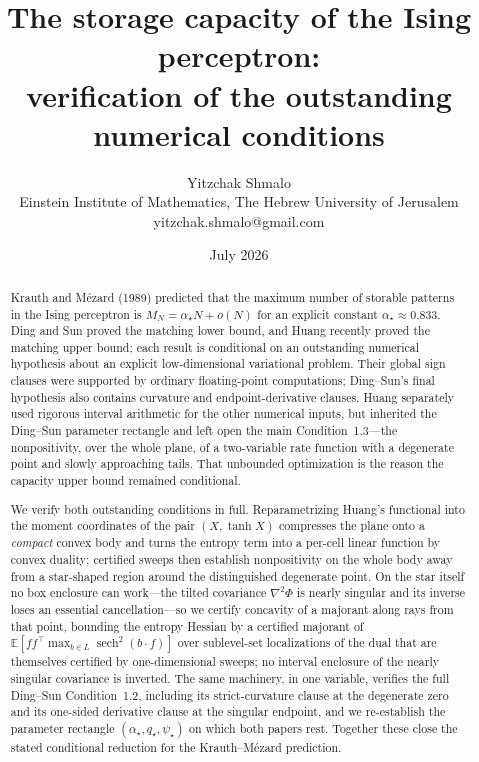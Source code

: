 \documentclass[11pt]{article}
\title{The storage capacity of the Ising perceptron:\\
verification of the outstanding numerical conditions}
\author{Yitzchak Shmalo\\
\small Einstein Institute of Mathematics, The Hebrew University of Jerusalem\\
\small yitzchak.shmalo@gmail.com}
\date{July 2026}
\newcommand{\E}{\mathbb{E}}
\begin{document}
\maketitle

\begin{abstract}
Krauth and M\'ezard (1989) predicted that the maximum number of storable
patterns in the Ising perceptron is $M_N=\alpha_\star N + o(N)$ for an
explicit constant $\alpha_\star \approx 0.833$. Ding and Sun proved the matching lower bound,
and Huang recently proved the matching upper bound; each result is
conditional on an outstanding numerical hypothesis about an explicit
low-dimensional variational problem. Their global sign clauses were supported
by ordinary floating-point computations; Ding--Sun's final hypothesis also
contains curvature and endpoint-derivative clauses. Huang separately used
rigorous interval arithmetic for the other numerical inputs, but inherited the Ding--Sun
parameter rectangle and left open the main Condition~1.3---the nonpositivity, over the
whole plane, of a two-variable rate function with a degenerate point and
slowly approaching tails. That
unbounded optimization is the reason the capacity upper bound remained
conditional.

We verify both outstanding conditions in full. Reparametrizing Huang's functional into the
moment coordinates of the pair $(X,\tanh X)$ compresses the plane onto a
\emph{compact} convex body and turns the entropy term into a per-cell linear
function by convex duality; certified sweeps then establish nonpositivity on
the whole body away from a star-shaped region around the distinguished
degenerate point. On the star itself no box enclosure can work---the tilted
covariance $\nabla^2\Phi$ is nearly singular and its inverse loses an
essential cancellation---so we certify concavity of a majorant along rays
from that point, bounding the entropy Hessian by a certified majorant of
$\E[ff^\top\max_{b\in L}\operatorname{sech}^2(b\cdot f)]$ over sublevel-set
localizations of the dual that are themselves certified by one-dimensional
sweeps; no interval enclosure of the nearly singular covariance is inverted.
The same machinery, in one variable,
verifies the full Ding--Sun Condition~1.2, including its strict-curvature
clause at the degenerate zero and its one-sided derivative clause at the
singular endpoint, and we
re-establish the parameter rectangle
$(\alpha_\star, q_\star, \psi_\star)$ on which both papers rest. Together
these close the stated conditional reduction for the Krauth--M\'ezard prediction.
\end{abstract}
\end{document}
